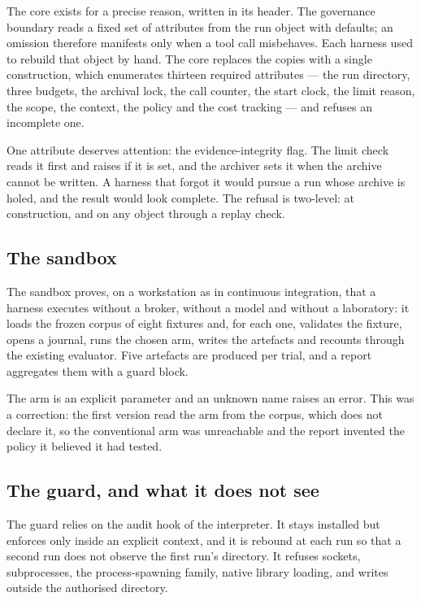 The core exists for a precise reason, written in its header. The governance
boundary reads a fixed set of attributes from the run object with defaults; an
omission therefore manifests only when a tool call misbehaves. Each harness used to
rebuild that object by hand. The core replaces the copies with a single
construction, which enumerates thirteen required attributes --- the run directory,
three budgets, the archival lock, the call counter, the start clock, the limit reason, the
scope, the context, the policy and the cost tracking --- and refuses an incomplete
one.

One attribute deserves attention: the evidence-integrity flag. The limit check
reads it first and raises if it is set, and the archiver sets it when the archive
cannot be written. A harness that forgot it would pursue a run whose archive is
holed, and the result would look complete. The refusal is two-level: at
construction, and on any object through a replay check.

\subsection{The sandbox}

The sandbox proves, on a workstation as in continuous integration, that a harness
executes without a broker, without a model and without a laboratory: it loads the
frozen corpus of eight fixtures and, for each one, validates the fixture, opens a
journal, runs the chosen arm, writes the artefacts and recounts through the
existing evaluator. Five artefacts are produced per trial, and a report aggregates
them with a guard block.

The arm is an explicit parameter and an unknown name raises an error. This was a
correction: the first version read the arm from the corpus, which does not declare
it, so the conventional arm was unreachable and the report invented the policy it
believed it had tested.

\subsection{The guard, and what it does not see}

The guard relies on the audit hook of the interpreter. It stays installed but
enforces only inside an explicit context, and it is rebound at each run so that a
second run does not observe the first run's directory. It refuses sockets,
subprocesses, the process-spawning family, native library loading, and writes
outside the authorised directory.

